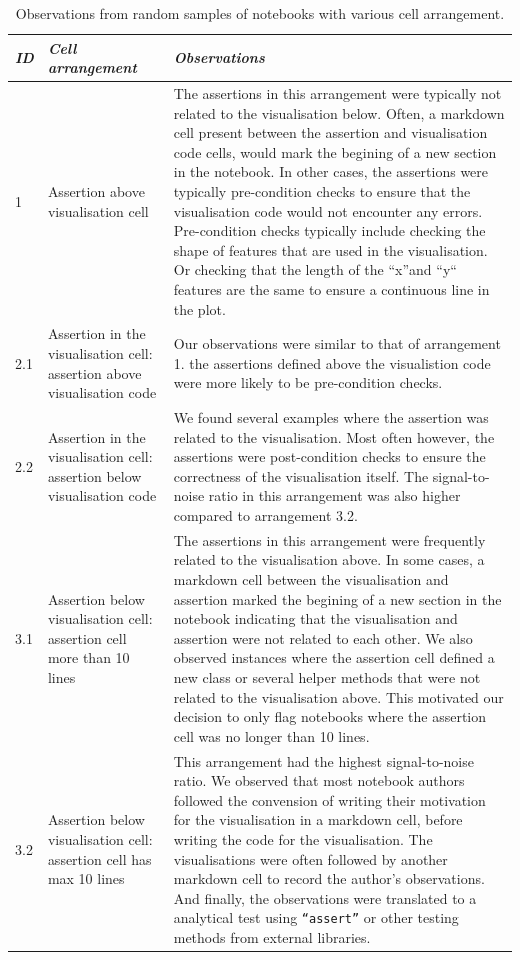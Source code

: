 \documentclass[acmsmall,screen,review,anonymous]{acmart}
\begin{document}
\begin{table}
  \centering
  \caption{Observations from random samples of notebooks with various
  cell arrangement.}
  \begin{tabular}{l p{} p{}}
    \toprule
    \emph{\textbf{ID}}&
    \emph{\textbf{Cell arrangement}} &
    \emph{\textbf{Observations}}\\
    \midrule
    1 &
    Assertion above visualisation cell &
    The assertions in this arrangement were typically not related to the visualisation below. Often, a markdown cell present between the assertion and visualisation code cells, would mark the begining of a new section in the notebook. In other cases, the assertions were typically pre-condition checks to ensure that the visualisation code would not encounter any errors. Pre-condition checks typically include checking the shape of features that are used in the visualisation. Or checking that the length of the ``x''and ``y`` features are the same to ensure a continuous line in the plot.\\
    2.1 &
    Assertion in the visualisation cell: assertion above visualisation code &
    Our observations were similar to that of arrangement 1. the assertions defined above the visualistion code were more likely to be pre-condition checks.\\
    2.2 &
    Assertion in the visualisation cell: assertion below visualisation code &
    We found several examples where the assertion was related to the visualisation. Most often however, the assertions were post-condition checks to ensure the correctness of the visualisation itself. The signal-to-noise ratio in this arrangement was also higher compared to arrangement 3.2.\\
    3.1 &
    Assertion below visualisation cell: assertion cell more than 10 lines &
    The assertions in this arrangement were frequently related to the visualisation above. In some cases, a markdown cell between the visualisation and assertion marked the begining of a new section in the notebook indicating that the visualisation and assertion were not related to each other. We also observed instances where the assertion cell defined a new class or several helper methods that were not related to the visualisation above. This motivated our decision to only flag notebooks where the assertion cell was no longer than 10 lines.\\
    3.2 &
    Assertion below visualisation cell: assertion cell has max 10 lines &
    This arrangement had the highest signal-to-noise ratio. We observed that most notebook authors followed the convension of writing their motivation for the visualisation in a markdown cell, before writing the code for the visualisation. The visualisations were often followed by another markdown cell to record the author's observations. And finally, the observations were translated to a analytical test using \texttt{``assert''} or other testing methods from external libraries.\\
    \bottomrule
  \end{tabular}
  \label{tab:cell-arrangement}
\end{table}
\end{document}
